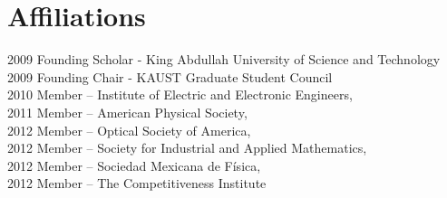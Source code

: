 \documentclass[margin,10pt]{res}
\begin{document}
\section{Affiliations}
2009 Founding Scholar - King Abdullah University of Science and Technology\\
2009 Founding Chair - KAUST Graduate Student Council\\
2010 Member -- Institute of Electric and Electronic Engineers,\\
2011 Member -- American Physical Society,\\
2012 Member -- Optical Society of America,\\
2012 Member -- Society for Industrial and Applied Mathematics,\\
2012 Member -- Sociedad Mexicana de Física,\\
2012 Member -- The Competitiveness Institute 
\end{document}
